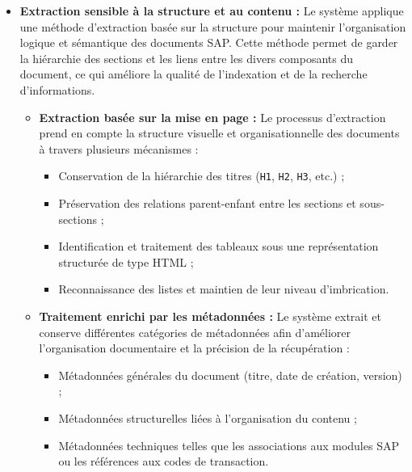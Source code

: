 \begin{itemize}[leftmargin=*, label=\textbullet]

  \item \textbf{Extraction sensible à la structure et au contenu :}
  Le système applique une méthode d’extraction basée sur la structure pour maintenir l’organisation logique et sémantique des documents SAP. Cette méthode permet de garder la hiérarchie des sections et les liens entre les divers composants du document, ce qui améliore la qualité de l’indexation et de la recherche d’informations.

  \begin{itemize}[leftmargin=2em, label=\textbullet]

    \item \textbf{Extraction basée sur la mise en page :}
    Le processus d’extraction prend en compte la structure visuelle et organisationnelle des documents à travers plusieurs mécanismes :
    \begin{itemize}[leftmargin=3em, label={--}]
      \item Conservation de la hiérarchie des titres (\texttt{H1}, \texttt{H2}, \texttt{H3}, etc.) ;
      \item Préservation des relations parent-enfant entre les sections et sous-sections ;
      \item Identification et traitement des tableaux sous une représentation structurée de type HTML ;
      \item Reconnaissance des listes et maintien de leur niveau d’imbrication.
    \end{itemize}

    \item \textbf{Traitement enrichi par les métadonnées :}
    Le système extrait et conserve différentes catégories de métadonnées afin d’améliorer l’organisation documentaire et la précision de la récupération :
    \begin{itemize}[leftmargin=3em, label={--}]
      \item Métadonnées générales du document (titre, date de création, version) ;
      \item Métadonnées structurelles liées à l’organisation du contenu ;
      \item Métadonnées techniques telles que les associations aux modules SAP ou les références aux codes de transaction.
    \end{itemize}

  \end{itemize}


\end{itemize}
